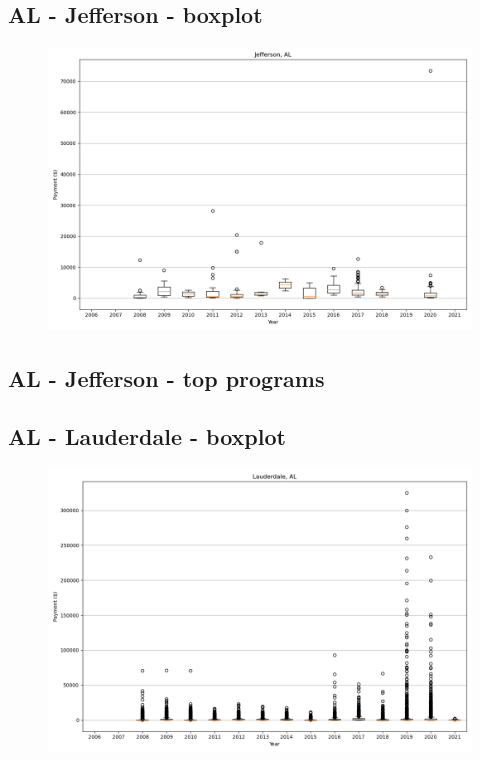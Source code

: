 \subsection*{AL - Jefferson - boxplot}
\begin{figure}[h]
\centering
\includegraphics[width=7in]{../output/boxplots/counties/Jefferson-AL_boxplot.png}
\end{figure}


\subsection*{AL - Jefferson - top programs}

\newpage
\subsection*{AL - Lauderdale - boxplot}
\begin{figure}[h]
\centering
\includegraphics[width=7in]{../output/boxplots/counties/Lauderdale-AL_boxplot.png}
\end{figure}


